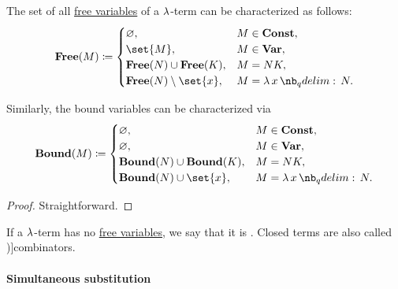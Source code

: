 \begin{proposition}\label{thm:lambda_variable_freeness_characterization}
  The set of all \hyperref[def:lambda_variable_freeness]{free variables} of a \( \mathrm{\lambda} \)-term can be characterized as follows:
  \begin{equation*}
    \op*{Free}(M) \coloneqq \begin{cases}
      \varnothing,                       &M \in \op*{Const}, \\
      \set{ M },                         &M \in \op*{Var}, \\
      \op*{Free}(N) \cup \op*{Free}(K),  &M = N K, \\
      \op*{Free}(N) \setminus \set{ x }, &M = \qabs x N. \\
    \end{cases}
  \end{equation*}

  Similarly, the bound variables can be characterized via
  \begin{equation*}
    \op*{Bound}(M) \coloneqq \begin{cases}
      \varnothing,                        &M \in \op*{Const}, \\
      \varnothing,                        &M \in \op*{Var}, \\
      \op*{Bound}(N) \cup \op*{Bound}(K), &M = N K, \\
      \op*{Bound}(N) \cup \set{ x },      &M = \qabs x N. \\
    \end{cases}
  \end{equation*}
\end{proposition}
\begin{proof}
  Straightforward.
\end{proof}

\begin{definition}\label{def:lambda_combinator}
  If a \( \mathrm{\lambda} \)-term has no \hyperref[def:lambda_variable_freeness]{free variables}, we say that it is . Closed terms are also called \term[ru=комбинаторы (\cite[188]{Герасимов2011Вычислимость})]{combinators}.
\end{definition}

\paragraph{Simultaneous substitution}

